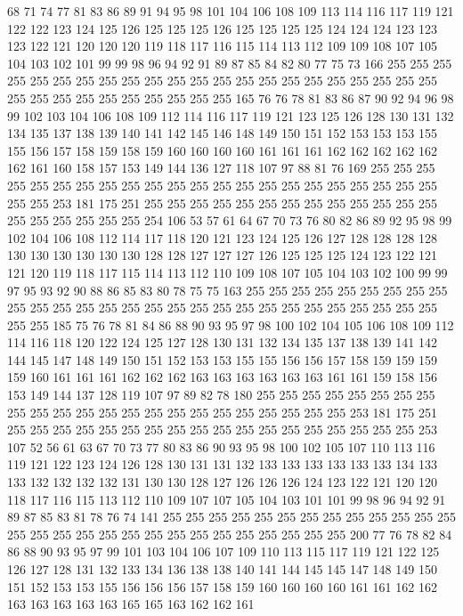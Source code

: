 68 71 74 77 81 83 86 89 91 94 95 98 101 104 106 108 109 113 114 116
117 119 121 122 122 123 124 125 126 125 125 125 126 125 125 125 125 124 124 124
123 123 123 122 121 120 120 120 119 118 117 116 115 114 113 112 109 109 108 107
105 104 103 102 101 99 99 98 96 94 92 91 89 87 85 84 82 80 77 75
73 166 255 255 255 255 255 255 255 255 255 255 255 255 255 255 255 255 255 255
255 255 255 255 255 255 255 255 255 255 255 255 255 255 165 76 76 78 81 83
86 87 90 92 94 96 98 99 102 103 104 106 108 109 112 114 116 117 119 121
123 125 126 128 130 131 132 134 135 137 138 139 140 141 142 145 146 148 149 150
151 152 153 153 153 155 155 156 157 158 159 158 159 160 160 160 160 161 161 161
162 162 162 162 162 162 161 160 158 157 153 149 144 136 127 118 107 97 88 81
76 169 255 255 255 255 255 255 255 255 255 255 255 255 255 255 255 255 255 255
255 255 255 255 255 255 253 181 175 251 255 255 255 255 255 255 255 255 255 255
255 255 255 255 255 255 255 255 255 254 106 53 57 61 64 67 70 73 76 80
82 86 89 92 95 98 99 102 104 106 108 112 114 117 118 120 121 123 124 125
126 127 128 128 128 128 130 130 130 130 130 130 128 128 127 127 127 126 125 125
125 124 123 122 121 121 120 119 118 117 115 114 113 112 110 109 108 107 105 104
103 102 100 99 99 97 95 93 92 90 88 86 85 83 80 78 75 75 163 255
255 255 255 255 255 255 255 255 255 255 255 255 255 255 255 255 255 255 255 255
255 255 255 255 255 255 255 255 255 185 75 76 78 81 84 86 88 90 93 95
97 98 100 102 104 105 106 108 109 112 114 116 118 120 122 124 125 127 128 130
131 132 134 135 137 138 139 141 142 144 145 147 148 149 150 151 152 153 153 155
155 156 156 157 158 159 159 159 159 160 161 161 161 162 162 162 163 163 163 163
163 163 161 161 159 158 156 153 149 144 137 128 119 107 97 89 82 78 180 255
255 255 255 255 255 255 255 255 255 255 255 255 255 255 255 255 255 255 255 255
255 255 253 181 175 251 255 255 255 255 255 255 255 255 255 255 255 255 255 255
255 255 255 255 253 107 52 56 61 63 67 70 73 77 80 83 86 90 93 95
98 100 102 105 107 110 113 116 119 121 122 123 124 126 128 130 131 131 132 133
133 133 133 133 133 134 133 133 132 132 132 132 131 130 130 128 127 126 126 126
124 123 122 121 120 120 118 117 116 115 113 112 110 109 107 107 105 104 103 101
101 99 98 96 94 92 91 89 87 85 83 81 78 76 74 141 255 255 255 255
255 255 255 255 255 255 255 255 255 255 255 255 255 255 255 255 255 255 255 255
255 255 255 255 200 77 76 78 82 84 86 88 90 93 95 97 99 101 103 104
106 107 109 110 113 115 117 119 121 122 125 126 127 128 131 132 133 134 136 138
138 140 141 144 145 145 147 148 149 150 151 152 153 153 155 156 156 156 157 158
159 160 160 160 160 161 161 162 162 163 163 163 163 163 165 165 163 162 162 161
